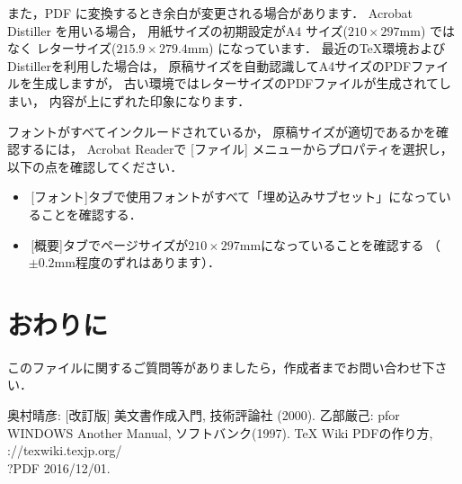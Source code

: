 \documentclass[twoside,twocolumn,11pt]{jarticle}  %
\begin{document}
また，PDF に変換するとき余白が変更される場合があります．
Acrobat Distiller を用いる場合，
用紙サイズの初期設定がA4 サイズ($210\times 297$mm) ではなく
レターサイズ($215.9\times 279.4$mm) になっています．
最近の\TeX 環境およびDistillerを利用した場合は，
原稿サイズを自動認識してA4サイズのPDFファイルを生成しますが，
古い環境ではレターサイズのPDFファイルが生成されてしまい，
内容が上にずれた印象になります．

フォントがすべてインクルードされているか，
原稿サイズが適切であるかを確認するには，
Acrobat Readerで [ファイル] メニューからプロパティを選択し，
以下の点を確認してください．
\begin{itemize}
\item \,[フォント]タブで使用フォントがすべて「埋め込みサブセット」になっていることを確認する．
\item \,[概要]タブでページサイズが$210\times 297$mmになっていることを確認する
（$\pm 0.2$mm程度のずれはあります）．
\end{itemize}



\section{おわりに}

このファイルに関するご質問等がありましたら，作成者までお問い合わせ下さい．
\begin{thebibliography}{9}
  奥村晴彦: [改訂版] \LaTeXe 美文書作成入門,
  技術評論社 (2000).
  乙部厳己: p\LaTeXe  for WINDOWS Another Manual,
  ソフトバンク(1997).
  TeX Wiki PDFの作り方,\\
  \verb@https://texwiki.texjp.org/\@\\
  \verb@?PDF%E3%81%AE%E4%BD%9C%E3%82%8A%E6%96%B9@,
  2016/12/01.
\end{thebibliography}
\end{document}
